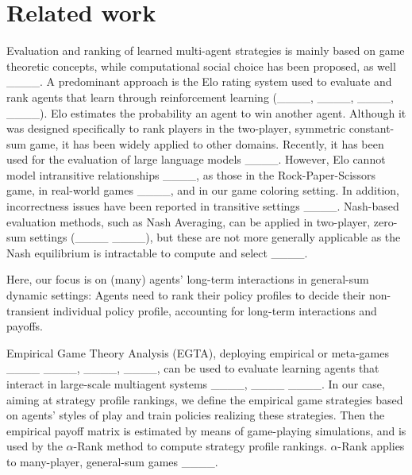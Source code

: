 \section{Related work}
Evaluation and ranking of learned multi-agent strategies is mainly based on game theoretic concepts, while computational social choice has been proposed, as well ____.
A predominant approach is the Elo rating system used to evaluate and rank agents that learn through reinforcement learning (____, ____, ____, ____). Elo estimates the probability an agent to win another agent. Although it was designed specifically to rank players in the two-player, symmetric constant-sum game, it has been widely applied to other domains. Recently, it has been used for the evaluation of large language models ____. However, Elo cannot model intransitive relationships ____, as those in the Rock-Paper-Scissors game, in real-world games ____, and in our game coloring setting. In addition, incorrectness issues have been reported in transitive settings ____. Nash-based evaluation methods, such as Nash Averaging, can be applied in two-player, zero-sum settings (____ ____), but these are not more generally applicable as the Nash equilibrium is intractable to compute and select ____.

Here, our focus is on (many) agents' long-term interactions in general-sum dynamic settings: Agents need to rank their policy profiles to decide their non-transient individual policy profile, accounting for long-term interactions and payoffs. 

Empirical Game Theory Analysis (EGTA), deploying empirical or meta-games ____ ____,  ____, ____, can be used to evaluate learning agents that interact in large-scale multiagent systems ____, ____ ____. In our case, aiming at strategy profile rankings, we define the empirical game strategies based on agents' styles of play and train policies realizing these strategies. Then the empirical payoff matrix is estimated by means of game-playing simulations, and is used by the $\alpha$-Rank method to compute strategy profile rankings. $\alpha$-Rank applies to many-player, general-sum games ____.


